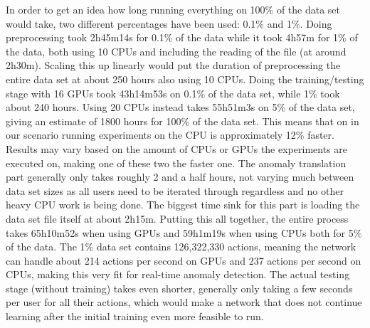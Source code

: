 In order to get an idea how long running everything on 100\% of the data set would take, two different percentages have been used: 0.1\% and 1\%. Doing preprocessing took 2h45m14s for 0.1\% of the data while it took 4h57m for 1\% of the data, both using 10 CPUs and including the reading of the file (at around 2h30m). Scaling this up linearly would put the duration of preprocessing the entire data set at about 250 hours also using 10 CPUs. Doing the training/testing stage with 16 GPUs took 43h14m53s on 0.1\% of the data set, while 1\% took about 240 hours. Using 20 CPUs instead takes
 55h51m3s on 5\% of the data set, giving an estimate of 1800 hours for 100\%
 of the data set. This means that on in our scenario running experiments on the CPU is approximately 12\% faster. Results may vary based on the amount of CPUs or GPUs the experiments are executed on, making one of these two the faster one. The anomaly translation part generally only takes roughly 2 and a half hours, not varying much between data set sizes as all users need to be iterated through regardless and no other heavy CPU work is being done. The biggest time sink for this part is loading the data set file itself at about 2h15m. Putting this all together, the entire process takes 
 65h10m52s when using GPUs and 59h1m19s when using CPUs both for 5\% of the data. The 1\% data set contains 126,322,330 actions, meaning the network can handle about 214 actions per second on GPUs and 237 actions per second on CPUs, making this very fit for real-time anomaly detection. The actual testing stage (without training) takes even shorter, generally only taking a few seconds per user for all their actions, which would make a network that does not continue learning after the initial training even more feasible to run.